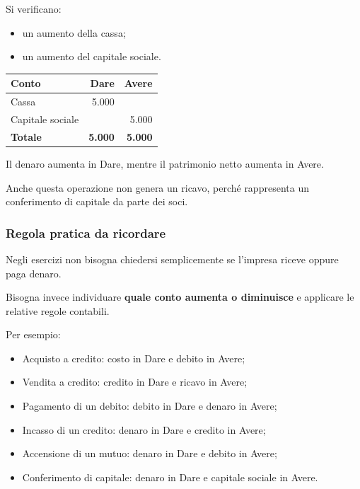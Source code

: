 \medskip

\noindent Si verificano:

\begin{itemize}
    \item un aumento della cassa;
    \item un aumento del capitale sociale.
\end{itemize}

\begin{center}
\begin{tabular}{|l|r|r|}
\hline
\textbf{Conto} & \textbf{Dare} & \textbf{Avere} \\
\hline
Cassa & 5.000 & \\
\hline
Capitale sociale & & 5.000 \\
\hline
\textbf{Totale} & \textbf{5.000} & \textbf{5.000} \\
\hline
\end{tabular}
\end{center}

\noindent Il denaro aumenta in Dare,
mentre il patrimonio netto aumenta in Avere.

\medskip

\noindent Anche questa operazione non genera
un ricavo, perché rappresenta un conferimento
di capitale da parte dei soci.


\subsubsection*{Regola pratica da ricordare}

\noindent Negli esercizi non bisogna chiedersi
semplicemente se l'impresa riceve oppure paga denaro.

\medskip

\noindent Bisogna invece individuare
\textbf{quale conto aumenta o diminuisce}
e applicare le relative regole contabili.

\medskip

\noindent Per esempio:

\begin{itemize}
    \item Acquisto a credito:
    costo in Dare e debito in Avere;

    \item Vendita a credito:
    credito in Dare e ricavo in Avere;

    \item Pagamento di un debito:
    debito in Dare e denaro in Avere;

    \item Incasso di un credito:
    denaro in Dare e credito in Avere;

    \item Accensione di un mutuo:
    denaro in Dare e debito in Avere;

    \item Conferimento di capitale:
    denaro in Dare e capitale sociale in Avere.
\end{itemize}


